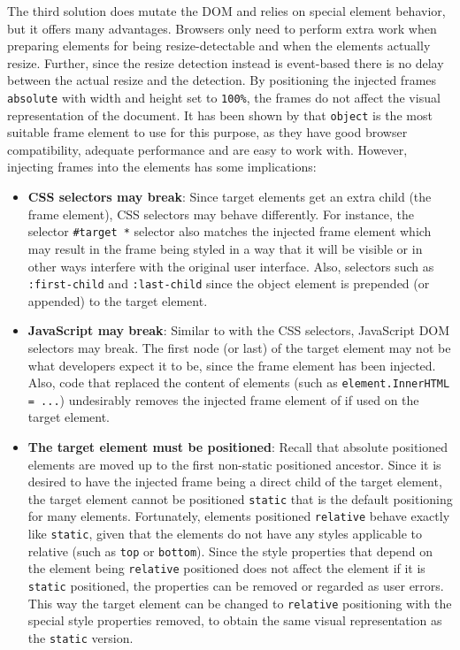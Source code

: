 \documentclass[a4paper,11pt]{kth-mag}
\newcommand{\code}[1]{\texttt{#1}}
\newcommand\abbr[2][]{\uppercase{#2}\ifthenelse{\equal{#1}{}}%
                     {}{#1}}
\begin{document}
          The third solution does mutate the \abbr{dom} and relies on special element behavior, but it offers many advantages.
          Browsers only need to perform extra work when preparing elements for being resize-detectable and when the elements actually resize.
          Further, since the resize detection instead is event-based there is no delay between the actual resize and the detection.
          By positioning the injected frames \code{absolute} with width and height set to \code{100\%}, the frames do not affect the visual representation of the document.
          It has been shown by \cite{backalley} that \code{object} is the most suitable frame element to use for this purpose, as they have good browser compatibility, adequate performance and are easy to work with.
          However, injecting frames into the elements has some implications:
          \begin{itemize}
            \item \textbf{\abbr{css} selectors may break}:
              Since target elements get an extra child (the frame element), \abbr{css} selectors may behave differently.
              For instance, the selector \code{\#target *} selector also matches the injected frame element which may result in the frame being styled in a way that it will be visible or in other ways interfere with the original user interface.
              Also, selectors such as \code{:first-child} and \code{:last-child} since the object element is prepended (or appended) to the target element.
            \item \textbf{JavaScript may break}:
              Similar to with the \abbr{css} selectors, JavaScript \abbr{dom} selectors may break.
              The first node (or last) of the target element may not be what developers expect it to be, since the frame element has been injected.
              Also, code that replaced the content of elements (such as \code{element.InnerHTML = ...}) undesirably removes the injected frame element of if used on the target element.
            \item \textbf{The target element must be positioned}:
              Recall that absolute positioned elements are moved up to the first non-static positioned ancestor.
              Since it is desired to have the injected frame being a direct child of the target element, the target element cannot be positioned \code{static} that is the default positioning for many elements.
              Fortunately, elements positioned \code{relative} behave exactly like \code{static}, given that the elements do not have any styles applicable to relative (such as \code{top} or \code{bottom}).
              Since the style properties that depend on the element being \code{relative} positioned does not affect the element if it is \code{static} positioned, the properties can be removed or regarded as user errors.
              This way the target element can be changed to \code{relative} positioning with the special style properties removed, to obtain the same visual representation as the \code{static} version.
          \end{itemize}
\end{document}

